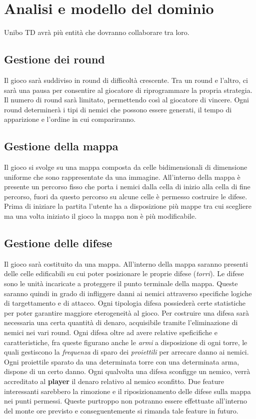 \documentclass[a4paper,12pt]{report}
\begin{document}
\section{Analisi e modello del dominio}

Unibo TD avrà più entità che dovranno collaborare tra loro.

\subsection*{Gestione dei round}
Il gioco sarà suddiviso in round di difficoltà crescente. Tra un round e l'altro, ci sarà una pausa per consentire al giocatore di riprogrammare la propria strategia. Il numero di round sarà limitato, permettendo così al giocatore di vincere.
Ogni round determinerà i tipi di nemici che possono essere generati, il tempo di apparizione e l'ordine in cui compariranno.

\subsection*{Gestione della mappa}
Il gioco si svolge su una mappa composta da celle bidimensionali di dimensione uniforme che sono rappresentate da una immagine. All'interno della mappa è presente un percorso fisso che porta i nemici dalla cella di inizio alla cella di fine percorso, fuori da questo percorso su alcune celle è permesso costruire le difese. Prima di iniziare la partita l'utente ha a disposizione più mappe tra cui scegliere ma una volta iniziato il gioco la mappa non è più modificabile.

\subsection*{Gestione delle difese}
Il gioco sarà costituito da una mappa. All'interno della mappa saranno presenti delle celle edificabili su cui poter posizionare le proprie difese (\textit{torri}). 
Le difese sono le unità incaricate a proteggere il punto terminale della mappa. Queste saranno quindi in grado di infliggere danni ai nemici attraverso specifiche logiche di targettamento e di attacco. Ogni tipologia difesa possiederà certe statistiche per poter garantire maggiore eterogeneità al gioco. Per costruire una difesa sarà necessaria una certa quantità di denaro, acquisibile tramite l'eliminazione di nemici nei vari round. Ogni difesa oltre ad avere relative speficifiche e caratteristiche, fra queste figurano anche le \textit{armi} a disposizione di ogni torre, le quali gestiscono la \textit{frequenza} di sparo dei \textit{proiettili} per arrecare danno ai nemici. Ogni proiettile sparato da una determinata torre con una determinata arma, dispone di un certo danno. Ogni qualvolta una difesa sconfigge un nemico, verrà accreditato al \textbf{player} il denaro relativo al nemico sconfitto. Due feature interessanti sarebbero la rimozione e il riposizionamento delle difese sulla mappa nei punti permessi. Queste purtroppo non potranno essere effettuate all’interno del monte ore previsto e conseguentemente si rimanda tale feature in futuro.
\end{document}
